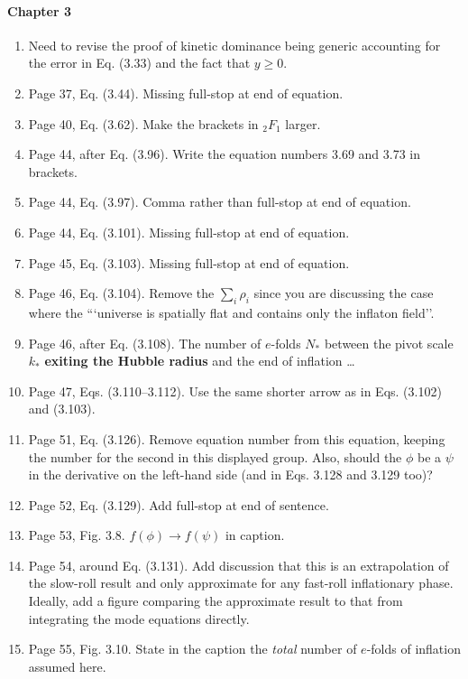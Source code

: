 \documentclass[11pt]{article}
\begin{document}
\paragraph{Chapter 3}
\begin{enumerate}
\item Need to revise the proof of kinetic dominance being generic
  accounting for the error in Eq. (3.33) and the fact that $y\geq 0$.
\item Page 37, Eq. (3.44). Missing full-stop at end of equation.
\item Page 40, Eq. (3.62). Make the brackets in ${}_2 F_1$ larger.
\item Page 44, after Eq. (3.96). Write the equation numbers 3.69 and
  3.73 in brackets.
\item Page 44, Eq. (3.97). Comma rather than full-stop at end of
  equation.
\item Page 44, Eq. (3.101). Missing full-stop at end of equation.
\item Page 45, Eq. (3.103). Missing full-stop at end of equation.
\item Page 46, Eq. (3.104). Remove the $\sum_i \rho_i$ since you are
  discussing the case where the ```universe is spatially flat and
  contains only the inflaton field''.
\item Page 46, after Eq. (3.108). The number of $e$-folds $N_\ast$
  between the pivot scale $k_\ast$ \textbf{exiting the Hubble radius}
  and the end of inflation \ldots
\item Page 47, Eqs. (3.110--3.112). Use the same shorter arrow as in
  Eqs. (3.102) and (3.103).
\item Page 51, Eq. (3.126). Remove equation number from this equation,
  keeping the number for the second in this displayed group. Also,
  should the $\phi$ be a $\psi$ in the derivative on the left-hand
  side (and in Eqs. 3.128 and 3.129 too)?
\item Page 52, Eq. (3.129). Add full-stop at end of sentence.
\item Page 53, Fig. 3.8. $f(\phi) \rightarrow f(\psi)$ in caption.
\item Page 54, around Eq. (3.131). Add discussion that this is an
  extrapolation of the slow-roll result and only approximate for any
  fast-roll inflationary phase. Ideally, add a figure comparing the
  approximate result to that from integrating the mode equations directly.
\item Page 55, Fig. 3.10. State in the caption the \emph{total} number
  of $e$-folds of inflation assumed here.

\end{enumerate}
\end{document}
